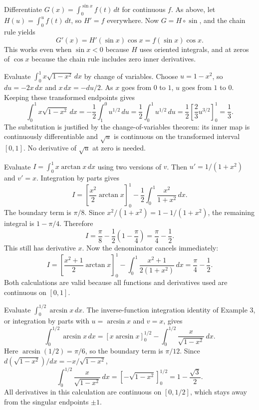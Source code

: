 \goal Differentiate $G(x)=\int_0^{\sin x}f(t)\,dt$ for continuous $f$.
As above, let $H(u)=\int_0^u f(t)\,dt$, so $H'=f$ everywhere.
Now $G=H\circ\sin$, and the chain rule yields
\[
 G'(x)=H'(\sin x)\cos x=f(\sin x)\cos x.
\]
This works even when $\sin x<0$ because $H$ uses oriented integrals,
and at zeros of $\cos x$ because the chain rule includes zero inner
derivatives.

\goal Evaluate $\int_0^1x\sqrt{1-x^2}\,dx$ by change of variables.
Choose $u=1-x^2$, so $du=-2x\,dx$ and $x\,dx=-du/2$.
As $x$ goes from $0$ to $1$, $u$ goes from $1$ to $0$.
Keeping these transformed endpoints gives
\[
 \int_0^1x\sqrt{1-x^2}\,dx
 =-\frac12\int_1^0u^{1/2}\,du
 =\frac12\int_0^1u^{1/2}\,du
 =\frac12\left[\frac23u^{3/2}\right]_0^1=\frac13.
\]
The substitution is justified by the change-of-variables theorem: its
inner map is continuously differentiable and $\sqrt u$ is continuous
on the transformed interval $[0,1]$. No derivative of $\sqrt u$ at zero
is needed.

\goal Evaluate $I=\int_0^1x\arctan x\,dx$ using two versions of $v$.
Then $u'=1/(1+x^2)$ and $v'=x$. Integration by parts gives
\[
 I=\left[\frac{x^2}2\arctan x\right]_0^1
      -\frac12\int_0^1\frac{x^2}{1+x^2}\,dx.
\]
The boundary term is $\pi/8$. Since $x^2/(1+x^2)=1-1/(1+x^2)$,
the remaining integral is $1-\pi/4$. Therefore
\[
 I=\frac\pi8-\frac12\left(1-\frac\pi4\right)
  =\frac\pi4-\frac12.
\]
This still has derivative $x$. Now the denominator cancels immediately:
\[
 I=\left[\frac{x^2+1}2\arctan x\right]_0^1
      -\int_0^1\frac{x^2+1}{2(1+x^2)}\,dx
  =\frac\pi4-\frac12.
\]
Both calculations are valid because all functions and derivatives used
are continuous on $[0,1]$.

\goal Evaluate $\int_0^{1/2}\arcsin x\,dx$.
The inverse-function integration identity of Example 3, or integration
by parts with $u=\arcsin x$ and $v=x$, gives
\[
 \int_0^{1/2}\arcsin x\,dx
 =\left[x\arcsin x\right]_0^{1/2}
   -\int_0^{1/2}\frac{x}{\sqrt{1-x^2}}\,dx.
\]
Here $\arcsin(1/2)=\pi/6$, so the boundary term is $\pi/12$.
Since $d(\sqrt{1-x^2})/dx=-x/\sqrt{1-x^2}$,
\[
 \int_0^{1/2}\frac{x}{\sqrt{1-x^2}}\,dx
 =\left[-\sqrt{1-x^2}\right]_0^{1/2}=1-\frac{\sqrt3}{2}.
\]
All derivatives in this calculation are continuous on $[0,1/2]$,
which stays away from the singular endpoints $\pm1$.

